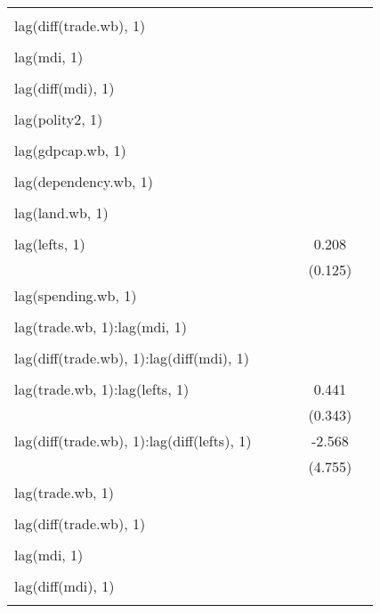 \begin{table}[htbp]
\begin{tabular}{l*{5}{c}}
  		& 		& 		& 		& 		& \\
lag(diff(trade.wb), 1) 		& 		& 		& 		& 		& \\
  		& 		& 		& 		& 		& \\
lag(mdi, 1) 		& 		& 		& 		& 		& \\
  		& 		& 		& 		& 		& \\
lag(diff(mdi), 1) 		& 		& 		& 		& 		& \\
  		& 		& 		& 		& 		& \\
lag(polity2, 1) 		& 		& 		& 		& 		& \\
  		& 		& 		& 		& 		& \\
lag(gdpcap.wb, 1) 		& 		& 		& 		& 		& \\
  		& 		& 		& 		& 		& \\
lag(dependency.wb, 1) 		& 		& 		& 		& 		& \\
  		& 		& 		& 		& 		& \\
lag(land.wb, 1) 		& 		& 		& 		& 		& \\
  		& 		& 		& 		& 		& \\
lag(lefts, 1) 		& 		& 		& 		&0.208\sym{*} 		& \\
  		& 		& 		& 		&(0.125) 		& \\
lag(spending.wb, 1) 		& 		& 		& 		& 		& \\
  		& 		& 		& 		& 		& \\
lag(trade.wb, 1):lag(mdi, 1) 		& 		& 		& 		& 		& \\
  		& 		& 		& 		& 		& \\
lag(diff(trade.wb), 1):lag(diff(mdi), 1) 		& 		& 		& 		& 		& \\
  		& 		& 		& 		& 		& \\
lag(trade.wb, 1):lag(lefts, 1) 		& 		& 		& 		&0.441 		& \\
  		& 		& 		& 		&(0.343) 		& \\
lag(diff(trade.wb), 1):lag(diff(lefts), 1) 		& 		& 		& 		&-2.568 		& \\
  		& 		& 		& 		&(4.755) 		& \\
lag(trade.wb, 1) 		& 		& 		& 		& 		& \\
  		& 		& 		& 		& 		& \\
lag(diff(trade.wb), 1) 		& 		& 		& 		& 		& \\
  		& 		& 		& 		& 		& \\
lag(mdi, 1) 		& 		& 		& 		& 		& \\
  		& 		& 		& 		& 		& \\
lag(diff(mdi), 1) 		& 		& 		& 		& 		& \\
  		& 		& 		& 		& 		& \\

\end{tabular}
\end{table}
